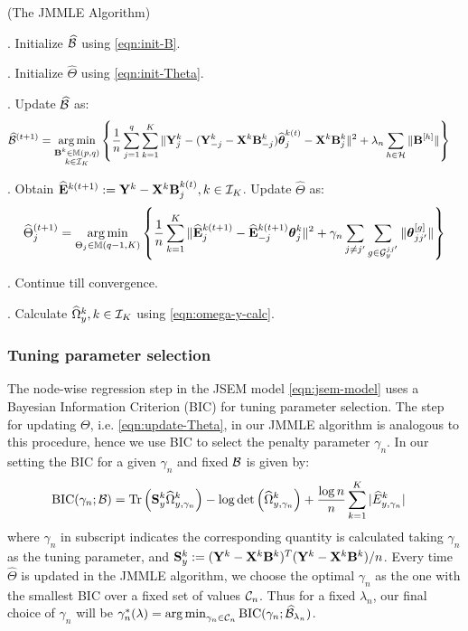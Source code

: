 \begin{Algorithm}
(The JMMLE Algorithm)
\label{algo:jmmle-algo}

. Initialize $\widehat {{\cal{B}}}$ using \eqref{eqn:init-B}.

. Initialize $\widehat \Theta$ using \eqref{eqn:init-Theta}.

. Update $\widehat {{\cal{B}}}$ as:
%
\begin{align}\label{eqn:update-B}
\widehat {{\cal{B}}}^{(t+1)} &= \operatorname*{arg\,min}_{\substack{{\mathbf{B}}^k \in {\mathbb{M}}(p,q)\\k \in {\cal{I}}_K}} \left\{ \frac{1}{n} \sum_{j=1}^q \sum_{k=1}^K \| {\mathbf{Y}}^k_j - ({\mathbf{Y}}_{-j}^k - {\mathbf{X}}^k {\mathbf{B}}_{-j}^k) \widehat {{\boldsymbol{\theta}}}_j^{k (t)} - {\mathbf{X}}^k {\mathbf{B}}_j^{k } \|^2
+ \lambda_n \sum_{h \in {\cal{H}}} \| {\mathbf{B}}^{[h]} \| \right\}
\end{align}

. Obtain $\widehat {{\mathbf{E}}}^{k (t+1)} := {\mathbf{Y}}^k - {\mathbf{X}}^k {\mathbf{B}}_j^{k (t)}, k \in {\cal{I}}_K$. Update $\widehat \Theta$ as:
%
\begin{align}\label{eqn:update-Theta}
\widehat \Theta_j^{(t+1)} = \operatorname*{arg\,min}_{\Theta_j \in {\mathbb{M}}(q-1, K)}
\left\{ \frac{1}{n} \sum_{k=1}^K
\| \widehat {{\mathbf{E}}}_j^{k (t+1)} - \widehat {{\mathbf{E}}}_{-j}^{k (t+1)} {\boldsymbol{\theta}}_j^k \|^2
+ \gamma_n \sum_{j \neq j'} \sum_{g \in {\cal{G}}_y^{jj'}} \| {\boldsymbol{\theta}}_{jj'}^{[g]} \| \right\}
\end{align}

. Continue till convergence.

. Calculate $\widehat \Omega_y^k, k \in {\cal{I}}_K$ using \eqref{eqn:omega-y-calc}.
\end{Algorithm}

\subsubsection{Tuning parameter selection}
The node-wise regression step in the JSEM model \eqref{eqn:jsem-model} uses a Bayesian Information Criterion (BIC) for tuning parameter selection. The step for updating $\Theta$, i.e. \eqref{eqn:update-Theta}, in our JMMLE algorithm is analogous to this procedure, hence we use BIC to select the penalty parameter $\gamma_n$. In our setting the BIC for a given $\gamma_n$ and fixed ${\cal{B}}$ is given by:
%
\begin{align*}
\text{BIC} (\gamma_n; {\cal{B}}) &=
\operatorname*{Tr} \left( {\mathbf{S}}_y^k \widehat \Omega_{y,\gamma_n}^k \right) - \log \det \left( \widehat \Omega_{y,\gamma_n}^k \right) +
\frac{\log n}{n} \sum_{k=1}^K | \widehat E_{y,\gamma_n}^k |
\end{align*}
%
where $\gamma_n$ in subscript indicates the corresponding quantity is calculated taking $\gamma_n$ as the tuning parameter, and ${\mathbf{S}}_y^k := ({\mathbf{Y}}^k - {\mathbf{X}}^k {\mathbf{B}}^k)^T ({\mathbf{Y}}^k - {\mathbf{X}}^k {\mathbf{B}}^k)/n$. Every time $\widehat \Theta$ is updated in the JMMLE algorithm, we choose the optimal $\gamma_n$ as the one with the smallest BIC over a fixed set of values ${\cal{C}}_n$. Thus for a fixed $\lambda_n$, our final choice of $\gamma_n$ will be 
$
\gamma_n^* (\lambda) = \operatorname*{arg\,min}_{\gamma_n \in {\cal{C}}_n} \text{BIC} (\gamma_n; \widehat {{\cal{B}}}_{\lambda_n})
$.

